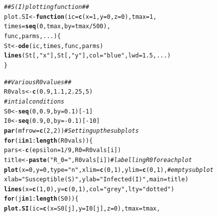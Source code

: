\documentclass[12pt]{article}\usepackage[]{graphicx}\usepackage[]{color}
\makeatletter
\newcommand{\hlnum}[1]{\textcolor[rgb]{0.686,0.059,0.569}{#1}}%
\newcommand{\hlstr}[1]{\textcolor[rgb]{0.192,0.494,0.8}{#1}}%
\newcommand{\hlcom}[1]{\textcolor[rgb]{0.678,0.584,0.686}{\textit{#1}}}%
\newcommand{\hlopt}[1]{\textcolor[rgb]{0,0,0}{#1}}%
\newcommand{\hlstd}[1]{\textcolor[rgb]{0.345,0.345,0.345}{#1}}%
\newcommand{\hlkwa}[1]{\textcolor[rgb]{0.161,0.373,0.58}{\textbf{#1}}}%
\newcommand{\hlkwb}[1]{\textcolor[rgb]{0.69,0.353,0.396}{#1}}%
\newcommand{\hlkwc}[1]{\textcolor[rgb]{0.333,0.667,0.333}{#1}}%
\newcommand{\hlkwd}[1]{\textcolor[rgb]{0.737,0.353,0.396}{\textbf{#1}}}%
\newenvironment{kframe}{%
 \def\at@end@of@kframe{}%
 \ifinner\ifhmode%
  \def\at@end@of@kframe{\end{minipage}}%
  \begin{minipage}{\columnwidth}%
 \fi\fi%
 \def\FrameCommand##1{\hskip\@totalleftmargin \hskip-\fboxsep
 \colorbox{shadecolor}{##1}\hskip-\fboxsep
     \hskip-\linewidth \hskip-\@totalleftmargin \hskip\columnwidth}%
 \MakeFramed {\advance\hsize-\width
   \@totalleftmargin\z@ \linewidth\hsize
   \@setminipage}}%
 {\par\unskip\endMakeFramed%
 \at@end@of@kframe}
\newenvironment{knitrout}{}{} %
\makeatother
\begin{document}
\begin{enumerate}[(a)]
\begin{knitrout}
\begin{kframe}
\begin{alltt}
\hlcom{##S(I) plotting function##}
\hlstd{plot.SI} \hlkwb{<-} \hlkwa{function}\hlstd{(}\hlkwc{ic}\hlstd{=}\hlkwd{c}\hlstd{(}\hlkwc{x}\hlstd{=}\hlnum{1}\hlstd{,}\hlkwc{y}\hlstd{=}\hlnum{0}\hlstd{,}\hlkwc{z}\hlstd{=}\hlnum{0}\hlstd{),} \hlkwc{tmax}\hlstd{=}\hlnum{1}\hlstd{,}
\hlkwc{times}\hlstd{=}\hlkwd{seq}\hlstd{(}\hlnum{0}\hlstd{,tmax,}\hlkwc{by}\hlstd{=tmax}\hlopt{/}\hlnum{500}\hlstd{),}
\hlkwc{func}\hlstd{,} \hlkwc{parms}\hlstd{,} \hlkwc{...} \hlstd{) \{}
\hlstd{St} \hlkwb{<-} \hlkwd{ode}\hlstd{(ic, times, func, parms)}
\hlkwd{lines}\hlstd{(St[,}\hlstr{"x"}\hlstd{], St[,}\hlstr{"y"}\hlstd{],} \hlkwc{col}\hlstd{=}\hlstr{"blue"}\hlstd{,} \hlkwc{lwd}\hlstd{=}\hlnum{1.5}\hlstd{, ... )}
\hlstd{\}}

\hlcom{##Various R0 values##}
\hlstd{R0vals} \hlkwb{<-} \hlkwd{c}\hlstd{(}\hlnum{0.9}\hlstd{,} \hlnum{1.1}\hlstd{,} \hlnum{2.25}\hlstd{,} \hlnum{5}\hlstd{)}
\hlcom{#intial conditions}
\hlstd{S0} \hlkwb{<-} \hlkwd{seq}\hlstd{(}\hlnum{0}\hlstd{,}\hlnum{0.9}\hlstd{,}\hlkwc{by}\hlstd{=}\hlnum{0.1}\hlstd{)[}\hlopt{-}\hlnum{1}\hlstd{]}
\hlstd{I0} \hlkwb{<-} \hlkwd{seq}\hlstd{(}\hlnum{0.9}\hlstd{,}\hlnum{0}\hlstd{,} \hlkwc{by}\hlstd{=}\hlopt{-}\hlnum{0.1}\hlstd{)[}\hlopt{-}\hlnum{10}\hlstd{]}
\hlkwd{par}\hlstd{(}\hlkwc{mfrow} \hlstd{=} \hlkwd{c}\hlstd{(}\hlnum{2}\hlstd{,}\hlnum{2}\hlstd{))} \hlcom{#Setting up the subplots}
\hlkwa{for} \hlstd{(i} \hlkwa{in} \hlnum{1}\hlopt{:}\hlkwd{length}\hlstd{(R0vals)) \{}
  \hlstd{pars} \hlkwb{<-}  \hlkwd{c}\hlstd{(}\hlkwc{epsilon} \hlstd{=} \hlnum{1}\hlopt{/}\hlnum{9}\hlstd{,} \hlkwc{R0} \hlstd{= R0vals[i])}
  \hlstd{title} \hlkwb{<-} \hlkwd{paste}\hlstd{(}\hlstr{"R_0 ="}\hlstd{, R0vals[i])} \hlcom{#labelling R0 for each plot}
  \hlkwd{plot}\hlstd{(}\hlkwc{x}\hlstd{=}\hlnum{0}\hlstd{,} \hlkwc{y}\hlstd{=}\hlnum{0}\hlstd{,} \hlkwc{type} \hlstd{=} \hlstr{"n"}\hlstd{,} \hlkwc{xlim} \hlstd{=} \hlkwd{c}\hlstd{(}\hlnum{0}\hlstd{,}\hlnum{1}\hlstd{),} \hlkwc{ylim} \hlstd{=} \hlkwd{c}\hlstd{(}\hlnum{0}\hlstd{,}\hlnum{1}\hlstd{),} \hlcom{#empty subplot}
       \hlkwc{xlab} \hlstd{=} \hlstr{"Susceptible (S)"}\hlstd{,} \hlkwc{ylab}\hlstd{=} \hlstr{"Infected (I)"}\hlstd{,} \hlkwc{main}\hlstd{=title)}
  \hlkwd{lines}\hlstd{(}\hlkwc{x}\hlstd{=}\hlkwd{c}\hlstd{(}\hlnum{1}\hlstd{,}\hlnum{0}\hlstd{),}\hlkwc{y}\hlstd{=}\hlkwd{c}\hlstd{(}\hlnum{0}\hlstd{,}\hlnum{1}\hlstd{),}\hlkwc{col}\hlstd{=}\hlstr{"grey"}\hlstd{,}\hlkwc{lty}\hlstd{=}\hlstr{"dotted"}\hlstd{)}
  \hlkwa{for} \hlstd{(j} \hlkwa{in} \hlnum{1}\hlopt{:}\hlkwd{length}\hlstd{(S0)) \{}
    \hlkwd{plot.SI}\hlstd{(}\hlkwc{ic}\hlstd{=}\hlkwd{c}\hlstd{(}\hlkwc{x}\hlstd{=S0[j],}\hlkwc{y}\hlstd{=I0[j],}\hlkwc{z}\hlstd{=}\hlnum{0}\hlstd{),} \hlkwc{tmax}\hlstd{=tmax,}

\end{alltt}
\end{kframe}
\end{knitrout}
\end{enumerate}
\end{document}
